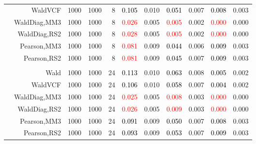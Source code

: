 \documentclass[
]{article}
\begin{document}
\begin{table}[H]
{\begin{tabular}[t]{lrrrrrrrlrr}
\hspace{1em} & WaldVCF & 1000 & 1000 & 8 & \textcolor{black}{0.105} & 0.010 & \textcolor{black}{0.051} & 0.007 & \textcolor{black}{0.008} & 0.003\\

\hspace{1em} & WaldDiag,MM3 & 1000 & 1000 & 8 & \textcolor{red}{0.026} & 0.005 & \textcolor{red}{0.005} & 0.002 & \textcolor{red}{0.000} & 0.000\\

\hspace{1em} & WaldDiag,RS2 & 1000 & 1000 & 8 & \textcolor{red}{0.028} & 0.005 & \textcolor{red}{0.005} & 0.002 & \textcolor{red}{0.000} & 0.000\\

\hspace{1em} & Pearson,MM3 & 1000 & 1000 & 8 & \textcolor{red}{0.081} & 0.009 & \textcolor{black}{0.044} & 0.006 & \textcolor{black}{0.009} & 0.003\\

\hspace{1em} & Pearson,RS2 & 1000 & 1000 & 8 & \textcolor{red}{0.081} & 0.009 & \textcolor{black}{0.045} & 0.007 & \textcolor{black}{0.009} & 0.003\\
\cmidrule{1-11}
\addlinespace[0.3em]
\multicolumn{11}{l}{\textbf{3F 15V}}\\
\hspace{1em} & Wald & 1000 & 1000 & 24 & \textcolor{black}{0.113} & 0.010 & \textcolor{black}{0.063} & 0.008 & \textcolor{black}{0.005} & 0.002\\

\hspace{1em} & WaldVCF & 1000 & 1000 & 24 & \textcolor{black}{0.106} & 0.010 & \textcolor{black}{0.058} & 0.007 & \textcolor{black}{0.004} & 0.002\\

\hspace{1em} & WaldDiag,MM3 & 1000 & 1000 & 24 & \textcolor{red}{0.025} & 0.005 & \textcolor{red}{0.008} & 0.003 & \textcolor{red}{0.000} & 0.000\\

\hspace{1em} & WaldDiag,RS2 & 1000 & 1000 & 24 & \textcolor{red}{0.026} & 0.005 & \textcolor{red}{0.009} & 0.003 & \textcolor{red}{0.000} & 0.000\\

\hspace{1em} & Pearson,MM3 & 1000 & 1000 & 24 & \textcolor{black}{0.091} & 0.009 & \textcolor{black}{0.050} & 0.007 & \textcolor{black}{0.008} & 0.003\\

\hspace{1em} & Pearson,RS2 & 1000 & 1000 & 24 & \textcolor{black}{0.093} & 0.009 & \textcolor{black}{0.053} & 0.007 & \textcolor{black}{0.009} & 0.003\\
\bottomrule
\end{tabular}}
\endgroup{}
\end{table}
\end{document}
